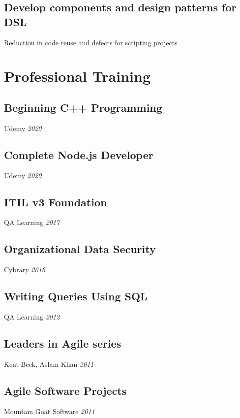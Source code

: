 \documentclass[]{article}
\begin{document}
\begin{minipage}[t]{0.30\textwidth}
	\subsection{Develop components and design patterns for DSL}
	Reduction in code reuse and defects for scripting projects
%
%
%
\section{Professional Training}
%	
	\subsection{Beginning C++ Programming}
	Udemy \textit{2020}
%	
	\subsection{Complete Node.js Developer}
	Udemy \textit{2020}
%	
%	
	\subsection{ITIL v3 Foundation}
	QA Learning \textit{2017}
%	
	\subsection{Organizational Data Security}
	Cybrary \textit{2016}
%		
	\subsection{Writing Queries Using SQL}
	QA Learning \textit{2012}
%	
	\subsection{Leaders in Agile series}
	Kent Beck, Aslam Khan \textit{2011}
%	
	\subsection{Agile Software Projects}
	Mountain Goat Software \textit{2011}
%
\end{minipage}
\hfill
%
%
\end{document}
